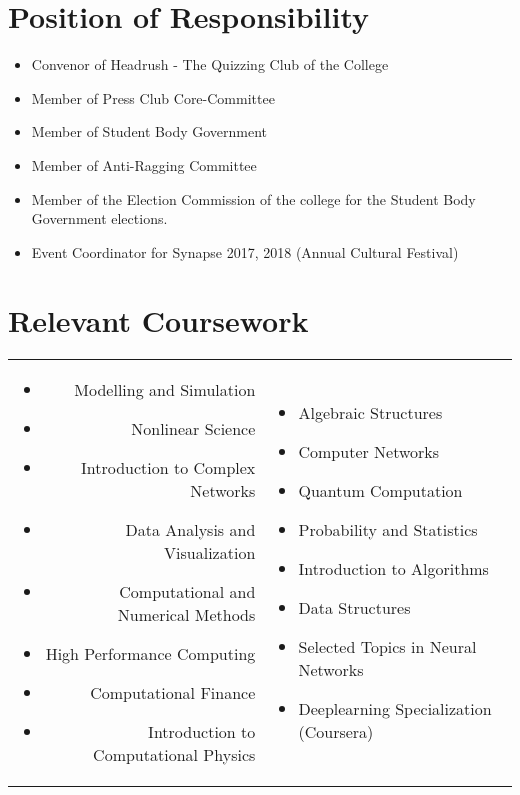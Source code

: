 \documentclass[letterpaper,11pt]{article}
\newcommand{\resumeOnlyItem}[1]{\item #1\vspace{-5pt}}
\newcommand{\resumeItemListStart}{\begin{itemize}}
\newcommand{\resumeItemListEnd}{\end{itemize}\vspace{-5pt}}
\begin{document}
% 
\section{Position of Responsibility}
\resumeItemListStart
    \resumeOnlyItem Convenor of Headrush - The Quizzing Club of the College
    \resumeOnlyItem Member of Press Club Core-Committee
    \resumeOnlyItem Member of Student Body Government
    \resumeOnlyItem Member of Anti-Ragging Committee
    \resumeOnlyItem Member of the Election Commission of the college for the Student Body Government elections.
    \resumeOnlyItem Event Coordinator for Synapse 2017, 2018 (Annual Cultural Festival)
\resumeItemListEnd
% 
\section{Relevant Coursework}
    
    \begin{tabular}{r l}
      \begin{minipage}[t]{0.4\textwidth}
        \resumeItemListStart
            \resumeOnlyItem Modelling and Simulation
            \resumeOnlyItem Nonlinear Science
            \resumeOnlyItem Introduction to Complex Networks
            \resumeOnlyItem Data Analysis and Visualization
            \resumeOnlyItem Computational and Numerical Methods
            \resumeOnlyItem High Performance Computing
            \resumeOnlyItem Computational Finance
            \resumeOnlyItem Introduction to Computational Physics
        \resumeItemListEnd
      \end{minipage}
      &
      \begin{minipage}[t]{0.4\textwidth}
        \resumeItemListStart
            \resumeOnlyItem Algebraic Structures
            \resumeOnlyItem Computer Networks
            \resumeOnlyItem Quantum Computation
            \resumeOnlyItem Probability and Statistics
            \resumeOnlyItem Introduction to Algorithms
            \resumeOnlyItem Data Structures
            \resumeOnlyItem Selected Topics in Neural Networks
            \resumeOnlyItem Deeplearning Specialization (Coursera)
        \resumeItemListEnd
      \end{minipage}
    \end{tabular}

\end{document}
